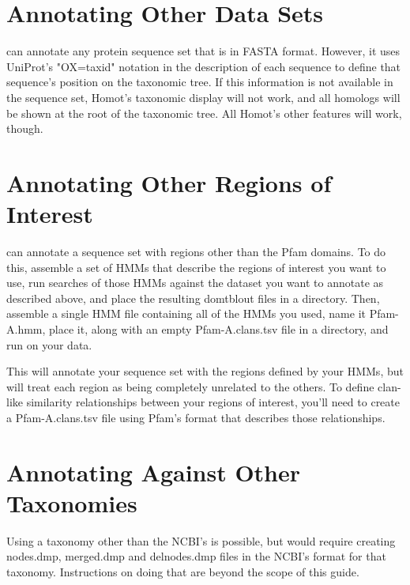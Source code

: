 \documentclass[notoc,justified,openany]{tufte-book}    %
\newcommand{\homot }{{Homot}\xspace}  %
\newcommand{\uniprot}{{UniProt}\xspace}
\begin{document}
\section{Annotating Other Data Sets}
 can annotate any protein sequence set that is in FASTA format.  However, it uses \uniprot's "OX=taxid" notation in the description of each sequence to define that sequence's position on the taxonomic tree.  If this information is not available in the sequence set, \homot's taxonomic display will not work, and all homologs will be shown at the root of the taxonomic tree.  All \homot's other features will work, though.

\section{Annotating Other Regions of Interest}
 can annotate a sequence set with regions other than the Pfam domains.  To do this, assemble a set of HMMs that describe the regions of interest you want to use, run searches of those HMMs against the dataset you want to annotate as described above, and place the resulting domtblout files in a directory.  Then, assemble a single HMM file containing all of the HMMs you used, name it {Pfam-A.hmm}, place it, along with an empty {Pfam-A.clans.tsv} file in a directory, and run  on your data.

This will annotate your sequence set with the regions defined by your HMMs, but will treat each region as being completely unrelated to the others.  To define clan-like similarity relationships between your regions of interest, you'll need to create a {Pfam-A.clans.tsv} file using Pfam's format that describes those relationships.

\section{Annotating Against Other Taxonomies}
Using a taxonomy other than the NCBI's is possible, but would require creating nodes.dmp, merged.dmp and delnodes.dmp files in the NCBI's format for that taxonomy.  Instructions on doing that are beyond the scope of this guide.



\end{document}
